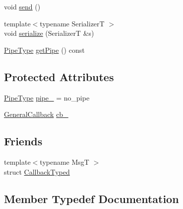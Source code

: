 \begin{DoxyCompactItemize}
\item 
void \hyperlink{structvt_1_1pipe_1_1callback_1_1cbunion_1_1_callback_raw_base_single_acfc41cee55923769ee3a9eca8b5d9031}{send} ()
\item 
{\footnotesize template$<$typename SerializerT $>$ }\\void \hyperlink{structvt_1_1pipe_1_1callback_1_1cbunion_1_1_callback_raw_base_single_afee30505e0bcec590b9675f93b44eadc}{serialize} (SerializerT \&s)
\item 
\hyperlink{namespacevt_ac9852acda74d1896f48f406cd72c7bd3}{Pipe\+Type} \hyperlink{structvt_1_1pipe_1_1callback_1_1cbunion_1_1_callback_raw_base_single_a3422df77d381724e530631720ec9720b}{get\+Pipe} () const
\end{DoxyCompactItemize}
\subsection*{Protected Attributes}
\begin{DoxyCompactItemize}
\item 
\hyperlink{namespacevt_ac9852acda74d1896f48f406cd72c7bd3}{Pipe\+Type} \hyperlink{structvt_1_1pipe_1_1callback_1_1cbunion_1_1_callback_raw_base_single_a7cff39d219279b2075d7db56e6b87944}{pipe\+\_\+} = no\+\_\+pipe
\item 
\hyperlink{structvt_1_1pipe_1_1callback_1_1cbunion_1_1_general_callback}{General\+Callback} \hyperlink{structvt_1_1pipe_1_1callback_1_1cbunion_1_1_callback_raw_base_single_a6535ef3d7baf0130dcf2c23f63496f3d}{cb\+\_\+}
\end{DoxyCompactItemize}
\subsection*{Friends}
\begin{DoxyCompactItemize}
\item 
{\footnotesize template$<$typename MsgT $>$ }\\struct \hyperlink{structvt_1_1pipe_1_1callback_1_1cbunion_1_1_callback_raw_base_single_a983194428523f2cd409417e221cc51c3}{Callback\+Typed}
\end{DoxyCompactItemize}


\subsection{Member Typedef Documentation}
\mbox{\label{structvt_1_1pipe_1_1callback_1_1cbunion_1_1_callback_raw_base_single_a734a9c83099de5bc1cd85f9da8dba7bb}} 
